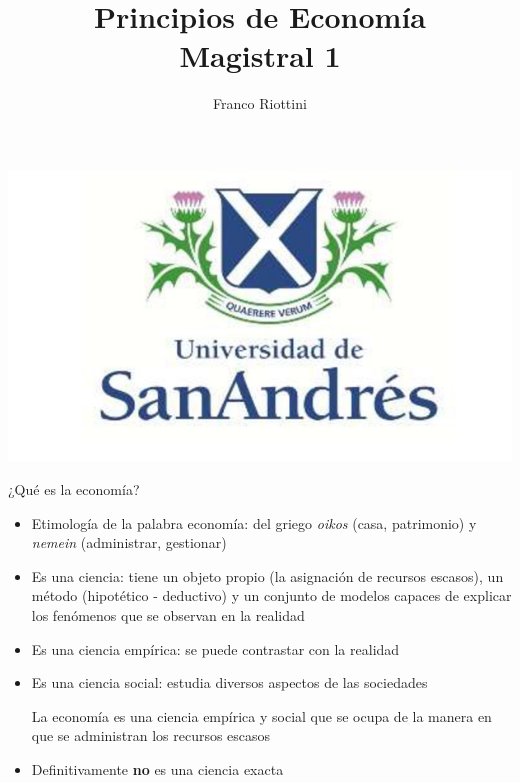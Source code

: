 \documentclass{beamer}
\title[Principios de Economía]{Principios de Economía \vspace{4mm} \\
Magistral 1}
\date{}
\author[Riottini]{Franco Riottini}
\institute[]{Universidad de San Andrés}
\begin{document}
\begin{frame}
\titlepage
\centering
\includegraphics[scale=0.2]{../Figures/logoUDESA.jpg} 
\end{frame}



\begin{frame}{¿Qué es la economía?}
    \begin{itemize}
        \item Etimología de la palabra economía: del griego \textit{oikos} (casa, patrimonio) y \textit{nemein} (administrar, gestionar) \vspace{2mm}
        \item Es una ciencia: tiene un objeto propio (la asignación de recursos escasos), un método (hipotético - deductivo) y un conjunto de modelos capaces de explicar los fenómenos que se observan en la realidad
        \item Es una ciencia empírica: se puede contrastar con la realidad 
        \item Es una ciencia social: estudia diversos aspectos de las sociedades
        \vspace{2mm}
        \begin{center}
            \begin{boxA}
            La economía es una ciencia empírica y social que se ocupa de la manera en que se administran los recursos escasos
            \end{boxA}
        \end{center}
        \item Definitivamente \textbf{no} es una ciencia exacta
    \end{itemize}
\end{frame}
\end{document}
